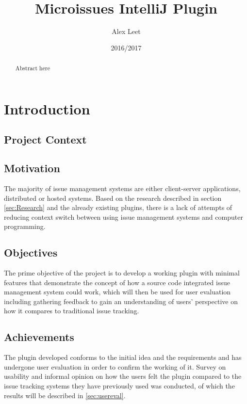 \documentclass{4thYearProject}
\begin{document}
\title{Microissues IntelliJ Plugin}
\author{Alex Leet}
\date{2016/2017}
\maketitle

\begin{abstract}
Abstract here
\end{abstract}

\educationalconsent

\tableofcontents

\chapter{Introduction}

\section{Project Context}



\section{Motivation}

The majority of issue management systems are either client-server applications, distributed or hosted systems. Based on the research described in section \ref{sec:Research} and the already existing plugins, there is a lack of attempts of reducing context switch between using issue management systems and computer programming. 

\section{Objectives}

The prime objective of the project is to develop a working plugin with minimal features that demonstrate the concept of how a source code integrated issue management system could work, which will then be used for user evaluation including gathering feedback to gain an understanding of users' perspective on how it compares to traditional issue tracking.

\section{Achievements}

The plugin developed conforms to the initial idea and the requirements and has undergone user evaluation in order to confirm the working of it. Survey on usability and informal opinion on how the users felt the plugin compared to the issue tracking systems they have previously used was conducted, of which the results will be described in \ref{sec:usereval}.
\end{document}
